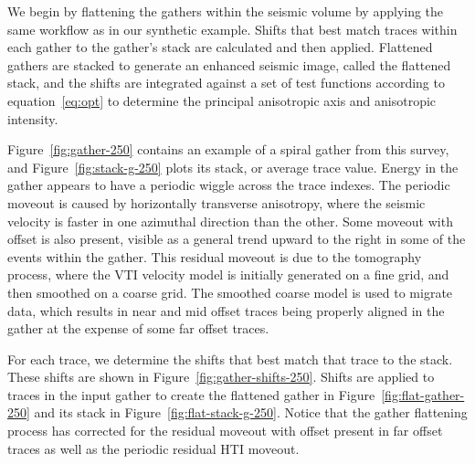 
We begin by flattening the gathers within the seismic volume by applying the same workflow as in our synthetic example.  Shifts that best match traces within each gather to the gather's stack are calculated and then applied.  Flattened gathers are stacked to generate an enhanced seismic image, called the flattened stack, and the shifts are integrated against a set of test functions according to equation~\ref{eq:opt} to determine the principal anisotropic axis and anisotropic intensity.

Figure~\ref{fig:gather-250} contains an example of a spiral gather from this survey, and Figure~\ref{fig:stack-g-250} plots its stack, or average trace value.  Energy in the gather appears to have a periodic wiggle across the trace indexes.  The periodic moveout is caused by horizontally transverse anisotropy, where the seismic velocity is faster in one azimuthal direction than the other.  Some moveout with offset is also present, visible as a general trend upward to the right in some of the events within the gather.  This residual moveout is due to the tomography process, where the VTI velocity model is initially generated on a fine grid, and then smoothed on a coarse grid.  The smoothed coarse model is used to migrate data, which results in near and mid offset traces being properly aligned in the gather at the expense of some far offset traces.



For each trace, we determine the shifts that best match that trace to the stack.  These shifts are shown in Figure~\ref{fig:gather-shifts-250}.
Shifts are applied to traces in the input gather to create the flattened gather in Figure~\ref{fig:flat-gather-250} and its stack in Figure~\ref{fig:flat-stack-g-250}. Notice that the gather flattening process has corrected for the residual moveout with offset present in far offset traces as well as the periodic residual HTI moveout.


